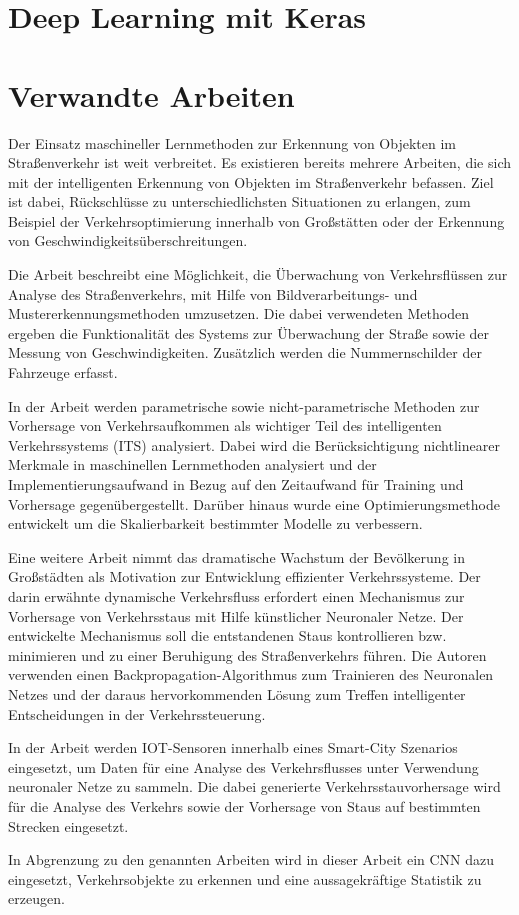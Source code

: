 \section{Deep Learning mit Keras}

\section{Verwandte Arbeiten}
Der Einsatz maschineller Lernmethoden zur Erkennung von Objekten im Straßenverkehr ist weit verbreitet.
Es existieren bereits mehrere Arbeiten, die sich mit der intelligenten Erkennung von Objekten im Straßenverkehr befassen. Ziel ist dabei, Rückschlüsse zu unterschiedlichsten Situationen zu erlangen, zum Beispiel der Verkehrsoptimierung innerhalb von Großstätten oder der Erkennung von Geschwindigkeitsüberschreitungen.

Die Arbeit \cite{Atkočiūnas_Blake_Juozapavičius_Kazimianec_2005} beschreibt eine Möglichkeit, die Überwachung von Verkehrsflüssen zur Analyse des Straßenverkehrs, mit Hilfe von Bildverarbeitungs- und Mustererkennungsmethoden umzusetzen. Die dabei verwendeten Methoden ergeben die Funktionalität des Systems zur Überwachung der Straße sowie der Messung von Geschwindigkeiten. Zusätzlich werden die Nummernschilder der Fahrzeuge erfasst.


In der Arbeit \cite{9148964} werden parametrische sowie nicht-parametrische Methoden zur Vorhersage von Verkehrsaufkommen als wichtiger Teil des intelligenten Verkehrssystems (ITS) analysiert. Dabei wird die Berücksichtigung nichtlinearer Merkmale in maschinellen Lernmethoden analysiert und der Implementierungsaufwand in Bezug auf den Zeitaufwand für Training und Vorhersage gegenübergestellt. Darüber hinaus wurde eine Optimierungsmethode entwickelt um die Skalierbarkeit bestimmter Modelle zu verbessern.

Eine weitere Arbeit \cite{ata2019modelling} nimmt das dramatische Wachstum der Bevölkerung in Großstädten als Motivation zur Entwicklung effizienter Verkehrssysteme. Der darin erwähnte dynamische Verkehrsfluss erfordert einen Mechanismus zur Vorhersage von Verkehrsstaus mit Hilfe künstlicher Neuronaler Netze. Der entwickelte Mechanismus soll die entstandenen Staus kontrollieren bzw. minimieren und zu einer Beruhigung des Straßenverkehrs führen. Die Autoren verwenden einen Backpropagation-Algorithmus zum Trainieren des Neuronalen Netzes und der daraus hervorkommenden Lösung zum Treffen intelligenter Entscheidungen in der Verkehrssteuerung.

In der Arbeit \cite{devi2017machine} werden \ac{IOT}-Sensoren innerhalb eines Smart-City Szenarios eingesetzt, um Daten für eine Analyse des Verkehrsflusses unter Verwendung neuronaler Netze zu sammeln. Die dabei generierte Verkehrsstauvorhersage wird für die Analyse des Verkehrs sowie der Vorhersage von Staus auf bestimmten Strecken eingesetzt.

In Abgrenzung zu den genannten Arbeiten wird in dieser Arbeit ein \ac{CNN} dazu eingesetzt, Verkehrsobjekte zu erkennen und eine aussagekräftige Statistik zu erzeugen.


